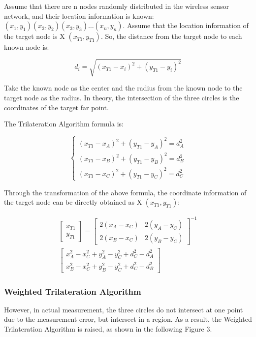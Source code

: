\documentclass{sigchi}
\begin{document}
Assume that there are n nodes randomly distributed in the wireless sensor network, and their location information is known: $(x_{1}, y_{1})(x_{2}, y_{2})(x_{3}, y_{3}) … (x_{n}, y_{n})$. Assume that the location information of the target node is X $(x_{T1}, y_{T1})$. So, the distance from the target node to each known node is:

\begin{equation*} 
d_{i}=\sqrt{(x_{T1}-x_{i})^{2}+(y_{T1}-y_{i})^{2}} \tag{1} 
\end{equation*}

Take the known node as the center and the radius from the known node to the target node as the radius. In theory, the intersection of the three circles is the coordinates of the target far point.

The Trilateration Algorithm formula is:

\begin{equation*} \begin{cases} (x_{T1}-x_{A})^{2}+(y_{T1}-y_{A})^{2}=d_{A}^{2}\\ (x_{T1}-x_{B})^{2}+(y_{T1}-y_{B})^{2}=d_{B}^{2}\\ (x_{T1}-x_{C})^{2}+(y_{T1}-y_{C})^{2}=d_{C}^{2} \end{cases} \tag{2} \end{equation*}

Through the transformation of the above formula, the coordinate information of the target node can be directly obtained as X $(x_{T1}, y_{T1})$:

\begin{equation} \begin{split} \begin{bmatrix} x_{T1}\\ y_{T1} \end{bmatrix}=\begin{bmatrix} 2(x_{A} -x_{C}) & 2(y_{A} -y_{C})\\ 2(x_{B}-x_{C}) & 2(y_{B}-y_{C}) \end{bmatrix}^{-1}
\\
\begin{bmatrix} x^{2}_{A}-x^{2}_{C}+y_{A}^{2}-y_{C}^{2}+d^{2}_{C}-d^{2}_{A}\\ x^{2}_{B}-x^{2}_{C}+y_{B}^{2}-y_{C}^{2}+d^{2}_{C}-d^{2}_{B} \end{bmatrix} \end{split} \tag{3}  \end{equation}


\subsubsection{Weighted Trilateration Algorithm}
However, in actual measurement, the three circles do not intersect at one point due to the measurement error, but intersect in a region. As a result, the Weighted Trilateration Algorithm is raised, as shown in the following Figure 3. 
\end{document}
